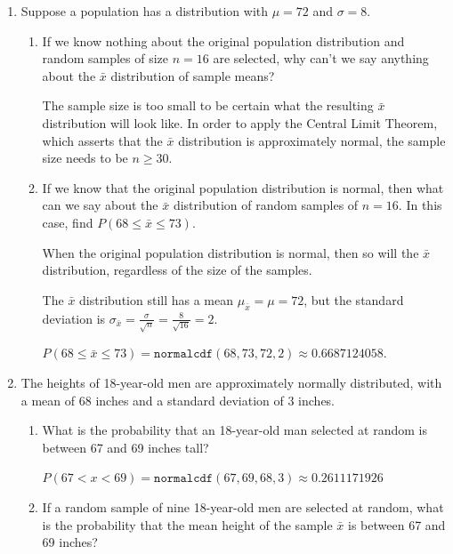 \documentclass{article}
\newcommand{\answer}[1]{\color{red}#1}
\begin{document}
\begin{enumerate}

\item Suppose a population has a distribution with $\mu = 72$ and $\sigma= 8$.
	\begin{enumerate}
	
	\item If we know nothing about the original population distribution and random samples of size $n=16$ are selected, why can't we say anything about the $\bar x$ distribution of sample means? 
	
	{\answer The sample size is too small to be certain what the resulting $\bar{x}$ distribution will look like.  In order to apply the Central Limit Theorem, which asserts that the $\bar{x}$ distribution is approximately normal, the sample size needs to be $n \geq 30$.
	} 

	\item If we know that the original population distribution is normal, then what can we say about the $\bar x$ distribution of random samples of $n=16$.  In this case, find $P(68 \leq \bar x \leq 73)$. 
	
	{\answer When the original population distribution is normal, then so will the $\bar{x}$ distribution, regardless of the size of the samples. 
	
	The $\bar{x}$ distribution still has a mean $\mu_{\bar{x}} = \mu = 72$, but the standard deviation is $\sigma_{\bar{x}} = \frac{\sigma}{\sqrt{n}} =\frac{8}{\sqrt{16}} = 2$. 
	
	$P(68 \leq \bar{x} \leq 73) = \texttt{normalcdf}(68, 73, 72, 2) \approx 0.6687124058$.
	} 
	
	\end{enumerate}
	
\item The heights of 18-year-old men are approximately normally distributed, with a mean of 68 inches and a standard deviation of 3 inches.

	\begin{enumerate}
	
	\item What is the probability that an 18-year-old man selected at random is between 67 and 69 inches tall? 
	
	{\answer $P(67 < x < 69) = \texttt{normalcdf}(67, 69, 68, 3) \approx 0.2611171926$
	} 

	\item If a random sample of nine 18-year-old men are selected at random, what is the probability that the mean height of the sample $\bar x$ is between 67 and 69 inches? 
	

\end{enumerate}
\end{enumerate}
\end{document}
